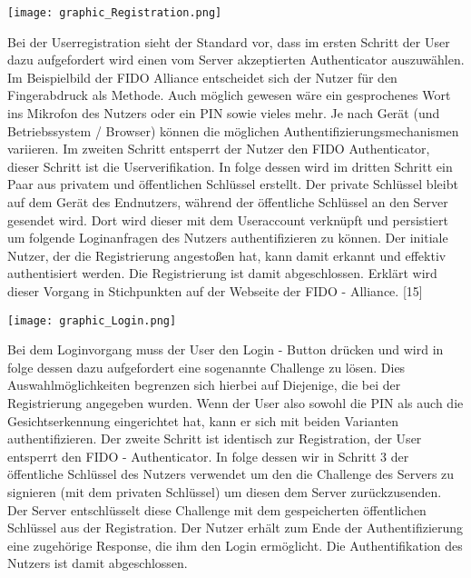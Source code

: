 \texttt{[image: graphic\_Registration.png]}

Bei der Userregistration sieht der Standard vor, dass im ersten Schritt der User dazu aufgefordert wird einen vom Server akzeptierten Authenticator auszuwählen. Im Beispielbild der FIDO Alliance entscheidet sich der Nutzer für den Fingerabdruck als Methode. Auch möglich gewesen wäre ein gesprochenes Wort ins Mikrofon des Nutzers oder ein PIN sowie vieles mehr. Je nach Gerät (und Betriebssystem / Browser) können die möglichen Authentifizierungsmechanismen variieren. Im zweiten Schritt entsperrt der Nutzer den FIDO Authenticator, dieser Schritt ist die Userverifikation. In folge dessen wird im dritten Schritt ein Paar aus privatem und öffentlichen Schlüssel erstellt. Der private Schlüssel bleibt auf dem Gerät des Endnutzers, während der öffentliche Schlüssel an den Server gesendet wird. Dort wird dieser mit dem Useraccount verknüpft und persistiert um folgende Loginanfragen des Nutzers authentifizieren zu können. Der initiale Nutzer, der die Registrierung angestoßen hat, kann damit erkannt und effektiv authentisiert werden. Die Registrierung ist damit abgeschlossen. Erklärt wird dieser Vorgang in Stichpunkten auf der Webseite der FIDO - Alliance. [15]
\newpage

\texttt{[image: graphic\_Login.png]}

Bei dem Loginvorgang muss der User den Login - Button drücken und wird in folge dessen dazu aufgefordert eine sogenannte Challenge zu lösen. Dies Auswahlmöglichkeiten begrenzen sich hierbei auf Diejenige, die bei der Registrierung angegeben wurden. Wenn der User also sowohl die PIN als auch die Gesichtserkennung eingerichtet hat, kann er sich mit beiden Varianten authentifizieren. Der zweite Schritt ist identisch zur Registration, der User entsperrt den FIDO - Authenticator. In folge dessen wir in Schritt 3 der öffentliche Schlüssel des Nutzers verwendet um den die Challenge des Servers zu signieren (mit dem privaten Schlüssel) um diesen dem Server zurückzusenden. Der Server entschlüsselt diese Challenge mit dem gespeicherten öffentlichen Schlüssel aus der Registration. Der Nutzer erhält zum Ende der Authentifizierung eine zugehörige Response, die ihm den Login ermöglicht. Die Authentifikation des Nutzers ist damit abgeschlossen.

